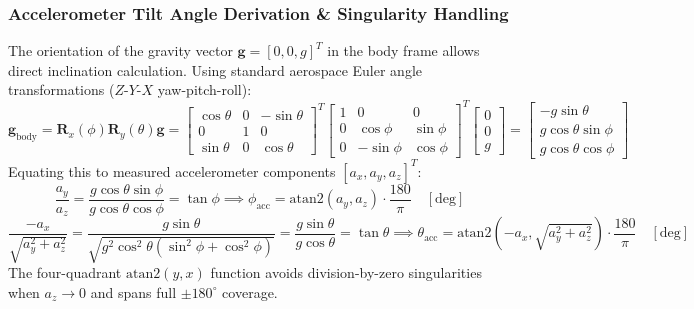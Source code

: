 \documentclass[11pt, a4paper]{article}
\begin{document}
\subsubsection{Accelerometer Tilt Angle Derivation \& Singularity Handling}
The orientation of the gravity vector $\mathbf{g} = [0, 0, g]^T$ in the body frame allows direct inclination calculation. Using standard aerospace Euler angle transformations ($Z$-$Y$-$X$ yaw-pitch-roll):
\begin{equation}
    \mathbf{g}_{\text{body}} = \mathbf{R}_x(\phi) \mathbf{R}_y(\theta) \mathbf{g} = 
    \begin{bmatrix}
        \cos\theta & 0 & -\sin\theta \\
        0 & 1 & 0 \\
        \sin\theta & 0 & \cos\theta
    \end{bmatrix}^T
    \begin{bmatrix}
        1 & 0 & 0 \\
        0 & \cos\phi & \sin\phi \\
        0 & -\sin\phi & \cos\phi
    \end{bmatrix}^T
    \begin{bmatrix} 0 \\ 0 \\ g \end{bmatrix} = 
    \begin{bmatrix}
        -g \sin\theta \\
        g \cos\theta \sin\phi \\
        g \cos\theta \cos\phi
    \end{bmatrix}
\end{equation}
Equating this to measured accelerometer components $[a_x, a_y, a_z]^T$:
\begin{equation}
    \frac{a_y}{a_z} = \frac{g \cos\theta \sin\phi}{g \cos\theta \cos\phi} = \tan\phi \implies \phi_{\text{acc}} = \text{atan2}(a_y, a_z) \cdot \frac{180}{\pi} \quad [\text{deg}]
\end{equation}
\begin{equation}
    \frac{-a_x}{\sqrt{a_y^2 + a_z^2}} = \frac{g \sin\theta}{\sqrt{g^2 \cos^2\theta(\sin^2\phi + \cos^2\phi)}} = \frac{g \sin\theta}{g \cos\theta} = \tan\theta \implies \theta_{\text{acc}} = \text{atan2}\left(-a_x, \sqrt{a_y^2 + a_z^2}\right) \cdot \frac{180}{\pi} \quad [\text{deg}]
\end{equation}
The four-quadrant $\text{atan2}(y, x)$ function avoids division-by-zero singularities when $a_z \to 0$ and spans full $\pm 180^\circ$ coverage.
\end{document}
